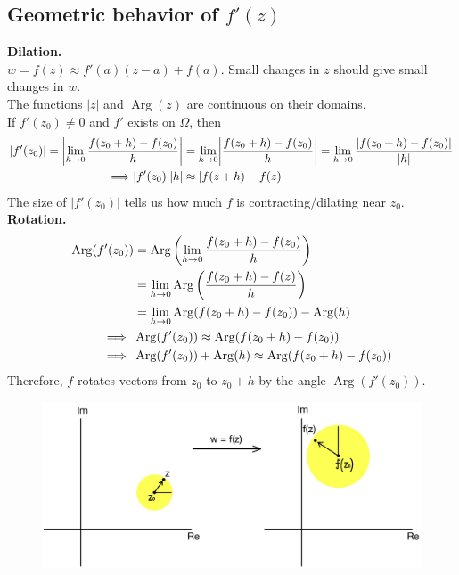 \documentclass[11pt]{article}
\DeclarePairedDelimiter\abs{\lvert}{\rvert}
\begin{document}
\subsection{Geometric behavior of $f'(z)$}
\textbf{Dilation.}\\ 
$w = f(z) \approx f'(a)(z - a) + f(a)$. Small changes in $z$ should give small changes in $w$. \\
The functions $|z|$ and $\operatorname{Arg}(z)$ are continuous on their domains. \\
If $f'(z_0) \neq 0$ and $f'$ exists on $\Omega$, then 
\begin{align*}
|f'(z_0)| = \abs*{\lim_{h \to 0}\frac{f(z_0 + h) - f(z_0)}{h}} &= \lim_{h \to 0} \abs*{\frac{f(z_0 + h) - f(z_0)}{h}} = \lim_{h \to 0}\frac{|f(z_0 + h) - f(z_0)|}{|h|} \\ 
\Longrightarrow |f'(z_0)||h| &\approx |f(z + h) - f(z)|
\end{align*}
The size of $|f'(z_0)|$ tells us how much $f$ is contracting/dilating near $z_0$. \\
\newpage
\textbf{Rotation.}
\begin{align*}
\operatorname{Arg}(f'(z_0)) &= \operatorname{Arg}\left(\lim_{h \to 0}\frac{f(z_0 + h) - f(z_0)}{h}\right) \\
&= \lim_{h \to 0}\operatorname{Arg}\left(\frac{f(z_0 + h) - f(z)}{h}\right) \\
& = \lim_{h \to 0} \operatorname{Arg}(f(z_0 + h) - f(z_0)) - \operatorname{Arg}(h) \\
\Longrightarrow \hspace{2mm}&\operatorname{Arg}(f'(z_0)) \approx \operatorname{Arg}(f(z_0 + h) - f(z_0)) \\
\Longrightarrow \hspace{2mm}&\operatorname{Arg}(f'(z_0)) + \operatorname{Arg}(h) \approx \operatorname{Arg}(f(z_0 + h) - f(z_0)) 
\end{align*}
Therefore, $f$ rotates vectors from $z_0$ to $z_0 + h$ by the angle $\operatorname{Arg}(f'(z_0))$. \\
\newline
  \begin{figure}[H]
  \includegraphics[scale = 0.3]{6_1}
  \centering
  \end{figure}
\end{document}

